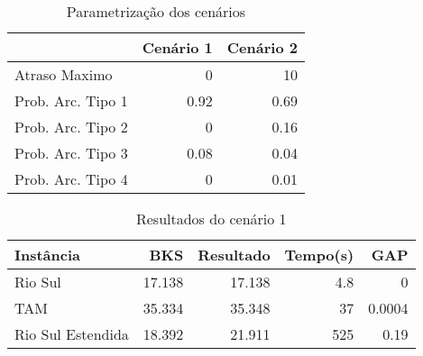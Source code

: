\begin{table}
\caption{Parametrização dos cenários}\label{tab:params}
\begin{center}


\begin{tabular}{l|rr}
\hline

 & Cenário 1 & Cenário 2 \\
 \hline
 Atraso Maximo & 0 & 10 \\
 Prob. Arc. Tipo 1 & 0.92 & 0.69\\ 
 Prob. Arc. Tipo 2 & 0 & 0.16\\
 Prob. Arc. Tipo 3 & 0.08 & 0.04 \\
 Prob. Arc. Tipo 4 & 0 & 0.01 \\
  
\hline

\end{tabular}
\end{center}
\end{table}

 



\begin{table}[ht]
\caption{Resultados do cenário 1}\label{tab:cenario1}
\begin{center}


\begin{tabular}{l r r r r}
\hline

Instância & BKS & Resultado & Tempo(s) & GAP \\
\hline

Rio Sul & 17.138 & 17.138 & 4.8 & 0\\
TAM & 35.334 & 35.348 & 37 &  0.0004\\
Rio Sul Estendida & 18.392 & 21.911 & 525 & 0.19\\

\hline
\end{tabular}

\end{center}
\end{table}

